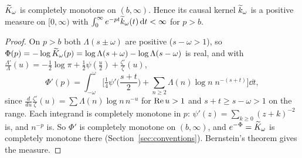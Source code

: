 \begin{proposition}\label{prop:cm}
$\widetilde K_\omega$ is completely monotone on $(b,\infty)$. Hence its causal kernel
$\widetilde k_\omega$ is a positive measure on $[0,\infty)$ with
$\int_0^\infty e^{-pt}\widetilde k_\omega(t)\,\mathrm d t<\infty$ for $p>b$.
\end{proposition}
\begin{proof}
On $p>b$ both $\Lambda(s\pm\omega)$ are positive ($s-\omega>1$), so
$\Phi(p)=-\log\widetilde K_\omega(p)=\log\Lambda(s+\omega)-\log\Lambda(s-\omega)$ is
real, and with $\frac{\Lambda'}{\Lambda}(u)=-\frac12\log\pi+\frac12\psi(\frac u2)+\frac{\zeta'}{\zeta}(u)$,
\begin{equation}\label{eq:phiprime}
 \Phi'(p)=\int_{-\omega}^{\omega}\Big[\tfrac14\psi'\Big(\frac{s+t}2\Big)
 +\sum_{n\geq2}\Lambda(n)\log n\;n^{-(s+t)}\Big]\dd t ,
\end{equation}
since $\frac{d}{du}\frac{\zeta'}{\zeta}(u)=\sum\Lambda(n)\log n\,n^{-u}$ for
$\operatorname{Re} u>1$ and $s+t\geq s-\omega>1$ on the range. Each integrand is completely
monotone in $p$: $\psi'(z)=\sum_{k\geq0}(z+k)^{-2}$ is, and $n^{-p}$ is. So
$\Phi'$ is completely monotone on $(b,\infty)$, and $e^{-\Phi}=\widetilde K_\omega$ is
completely monotone there (Section~\ref{sec:conventions}). Bernstein's theorem
gives the measure.
\end{proof}

